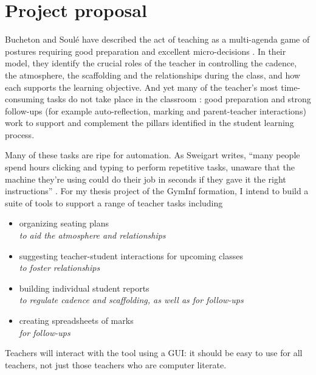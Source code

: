 \documentclass[10pt]{article}
\begin{document}
\appendix

\section{Project proposal}

Bucheton and Soulé have described the act of teaching as a multi-agenda game of postures requiring good preparation and excellent micro-decisions \cite{BS09}. In their model, they identify the crucial roles of the teacher in controlling the cadence, the atmosphere, the scaffolding and the relationships during the class, and how each supports the learning objective. And yet many of the teacher's most time-consuming tasks do not take place in the classroom \cite{Bryant20}: good preparation and strong follow-ups (for example auto-reflection, marking and parent-teacher interactions) work to support and complement the pillars identified in the student learning process.

Many of these tasks are ripe for automation. As Sweigart writes, ``many people spend hours clicking and typing to perform repetitive tasks, unaware that the machine they’re using could do their job in seconds if they gave it the right instructions'' \cite{Swei15}.  For my thesis project of the GymInf formation, I intend to build a suite of tools to support a range of teacher tasks including 
\begin{itemize} 
\item organizing seating plans \\
\emph{to aid the atmosphere and relationships} 
\item suggesting teacher-student interactions for upcoming classes \\
\emph{to foster relationships}
\item building individual student reports \\
\emph{to regulate cadence and scaffolding, as well as for follow-ups}
\item creating spreadsheets of marks \\
\emph{for follow-ups}
\end{itemize}
Teachers will interact with the tool using a GUI: it should be easy to use for all teachers, not just those teachers who are computer literate.
\end{document}
